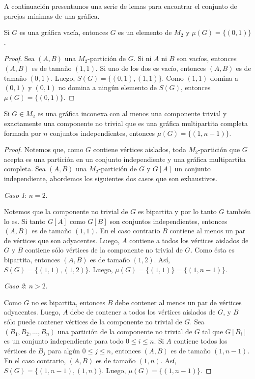 A continuación presentamos una serie de lemas para encontrar el conjunto de parejas mínimas de una gráfica.

\begin{lemma}\label{lema_parejas_01}
Si $G$ es una gr\'afica vac\'ia, entonces $G$ es un elemento de $M_2$ y
$\mu(G) = \{(0,1)\}$.
\end{lemma}

\begin{proof}
Sea $(A,B)$ una $M_2$-partición de $G$. Si ni $A$ ni $B$ son vacíos, entonces $(A,B)$ es de tamaño $(1,1)$. Si uno de los dos es vacío, entonces $(A,B)$ es de tamaño $(0,1)$. Luego, $S(G)=\{(0,1),(1,1)\}$. Como $(1,1)$ domina a $(0,1)$ y $(0,1)$ no domina a ningún elemento de $S(G)$, entonces $\mu(G)=\{(0,1)\}$.
\end{proof}

\begin{lemma}\label{lema_parejas_02}
Si $G \in M_2$ es una gráfica inconexa con al menos una componente trivial y exactamente una componente no trivial que es una gráfica multipartita completa formada por $n$ conjuntos independientes, entonces $\mu(G)=\{(1,n-1)\}$.
\end{lemma}

\begin{proof}
Notemos que, como $G$ contiene vértices aislados, toda $M_2$-partición que $G$ acepta es una partición en un conjunto independiente y una gráfica multipartita completa. Sea $(A,B)$ una $M_2$-partición de $G$ y $G[A]$ un conjunto independiente, abordemos los siguientes dos casos que son exhaustivos.

\emph{Caso 1}: $n = 2$.

Notemos que la componente no trivial de $G$ es bipartita y por lo tanto $G$ también lo es. Si tanto $G[A]$ como $G[B]$ son conjuntos independientes, entonces $(A,B)$ es de tamaño $(1,1)$. En el caso contrario $B$ contiene al menos un par de vértices que son adyacentes. Luego, $A$ contiene a todos los vértices aislados de $G$ y $B$ contiene sólo vértices de la componente no trivial de $G$. Como ésta es bipartita, entonces $(A,B)$ es de tamaño $(1,2)$. Así, $S(G)=\{(1,1),(1,2)\}$. Luego, $\mu(G)=\{(1,1)\} = \{(1,n-1)\}$.

\emph{Caso 2}: $n > 2$.

Como $G$ no es bipartita, entonces $B$ debe contener al menos un par de vértices adyacentes. Luego, $A$ debe de contener a todos los vértices aislados de $G$, y $B$ sólo puede contener vértices de la componente no trivial de $G$. Sea $(B_1, B_2, \dots, B_n)$ una partición de la componente no trivial de $G$ tal que $G[B_i]$ es un conjunto independiente para todo $0\le i \le n$. Si $A$ contiene todos los vértices de $B_j$ para algún $0\le j \le n$, entonces $(A,B)$ es de tamaño $(1,n-1)$. En el caso contrario, $(A,B)$ es de tamaño $(1,n)$. Así, $S(G)=\{(1,n-1),(1,n)\}$. Luego, $\mu(G)=\{(1,n-1)\}$.

\end{proof}


